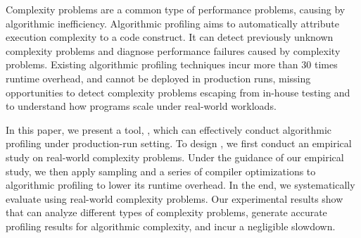 Complexity problems are a common type of performance problems, 
causing by algorithmic inefficiency. 
Algorithmic profiling aims to automatically attribute execution complexity to a code construct.
It can detect previously unknown complexity problems and diagnose performance failures 
caused by complexity problems. 
Existing algorithmic profiling techniques
incur more than $30$ times runtime overhead,
and cannot be deployed in production runs, missing opportunities 
to detect complexity problems escaping from in-house testing 
and to understand how programs scale under real-world workloads. 

In this paper, we present a tool, \Tool, 
which can effectively conduct algorithmic profiling under production-run setting. 
To design \Tool, we first conduct an empirical study on 
real-world complexity problems.
Under the guidance of our empirical study, we then apply 
sampling and a series of compiler optimizations to 
algorithmic profiling to lower its runtime overhead.
In the end, we systematically evaluate \Tool using real-world complexity problems. 
Our experimental results show that \Tool 
can analyze different types of complexity problems, 
generate accurate profiling results for algorithmic complexity, 
and incur a negligible slowdown. 



